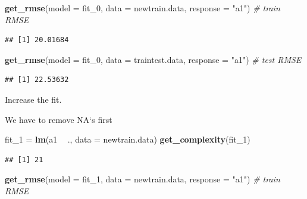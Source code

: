\documentclass[]{report}
\newenvironment{Shaded}{\begin{snugshade}}{\end{snugshade}}
\newcommand{\KeywordTok}[1]{\textcolor[rgb]{0.13,0.29,0.53}{\textbf{#1}}}
\newcommand{\DataTypeTok}[1]{\textcolor[rgb]{0.13,0.29,0.53}{#1}}
\newcommand{\DecValTok}[1]{\textcolor[rgb]{0.00,0.00,0.81}{#1}}
\newcommand{\StringTok}[1]{\textcolor[rgb]{0.31,0.60,0.02}{#1}}
\newcommand{\CommentTok}[1]{\textcolor[rgb]{0.56,0.35,0.01}{\textit{#1}}}
\newcommand{\OperatorTok}[1]{\textcolor[rgb]{0.81,0.36,0.00}{\textbf{#1}}}
\newcommand{\NormalTok}[1]{#1}
\begin{document}
\begin{Shaded}
\begin{Highlighting}[]
\KeywordTok{get_rmse}\NormalTok{(}\DataTypeTok{model =}\NormalTok{ fit_}\DecValTok{0}\NormalTok{, }\DataTypeTok{data =}\NormalTok{ newtrain.data, }\DataTypeTok{response =} \StringTok{"a1"}\NormalTok{) }\CommentTok{# train RMSE}
\end{Highlighting}
\end{Shaded}

\begin{verbatim}
## [1] 20.01684
\end{verbatim}

\begin{Shaded}
\begin{Highlighting}[]
\KeywordTok{get_rmse}\NormalTok{(}\DataTypeTok{model =}\NormalTok{ fit_}\DecValTok{0}\NormalTok{, }\DataTypeTok{data =}\NormalTok{ traintest.data, }\DataTypeTok{response =} \StringTok{"a1"}\NormalTok{) }\CommentTok{# test RMSE}
\end{Highlighting}
\end{Shaded}

\begin{verbatim}
## [1] 22.53632
\end{verbatim}

Increase the fit.

We have to remove NA`s first

\begin{Shaded}
\begin{Highlighting}[]
\NormalTok{fit_}\DecValTok{1}\NormalTok{ =}\StringTok{ }\KeywordTok{lm}\NormalTok{(a1 }\OperatorTok{~}\StringTok{ }\NormalTok{., }\DataTypeTok{data =}\NormalTok{ newtrain.data)}
\KeywordTok{get_complexity}\NormalTok{(fit_}\DecValTok{1}\NormalTok{)}
\end{Highlighting}
\end{Shaded}

\begin{verbatim}
## [1] 21
\end{verbatim}

\begin{Shaded}
\begin{Highlighting}[]
\KeywordTok{get_rmse}\NormalTok{(}\DataTypeTok{model =}\NormalTok{ fit_}\DecValTok{1}\NormalTok{, }\DataTypeTok{data =}\NormalTok{ newtrain.data, }\DataTypeTok{response =} \StringTok{"a1"}\NormalTok{) }\CommentTok{# train RMSE}
\end{Highlighting}
\end{Shaded}
\end{document}
